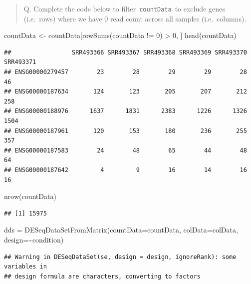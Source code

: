 \documentclass[
]{article}
\newenvironment{Shaded}{\begin{snugshade}}{\end{snugshade}}
\newcommand{\AttributeTok}[1]{\textcolor[rgb]{0.77,0.63,0.00}{#1}}
\newcommand{\DecValTok}[1]{\textcolor[rgb]{0.00,0.00,0.81}{#1}}
\newcommand{\FunctionTok}[1]{\textcolor[rgb]{0.00,0.00,0.00}{#1}}
\newcommand{\NormalTok}[1]{#1}
\newcommand{\OtherTok}[1]{\textcolor[rgb]{0.56,0.35,0.01}{#1}}
\newcommand{\SpecialCharTok}[1]{\textcolor[rgb]{0.00,0.00,0.00}{#1}}
\begin{document}
\begin{quote}
Q. Complete the code below to filter~\texttt{countData}~to exclude genes
(i.e.~rows) where we have 0 read count across all samples
(i.e.~columns).
\end{quote}

\begin{Shaded}
\begin{Highlighting}[]
\NormalTok{countData }\OtherTok{\textless{}{-}}\NormalTok{ countData[}\FunctionTok{rowSums}\NormalTok{(countData }\SpecialCharTok{!=} \DecValTok{0}\NormalTok{) }\SpecialCharTok{\textgreater{}} \DecValTok{0}\NormalTok{, ]}
\FunctionTok{head}\NormalTok{(countData)}
\end{Highlighting}
\end{Shaded}

\begin{verbatim}
##                 SRR493366 SRR493367 SRR493368 SRR493369 SRR493370 SRR493371
## ENSG00000279457        23        28        29        29        28        46
## ENSG00000187634       124       123       205       207       212       258
## ENSG00000188976      1637      1831      2383      1226      1326      1504
## ENSG00000187961       120       153       180       236       255       357
## ENSG00000187583        24        48        65        44        48        64
## ENSG00000187642         4         9        16        14        16        16
\end{verbatim}

\begin{Shaded}
\begin{Highlighting}[]
\FunctionTok{nrow}\NormalTok{(countData)}
\end{Highlighting}
\end{Shaded}

\begin{verbatim}
## [1] 15975
\end{verbatim}

\begin{Shaded}
\begin{Highlighting}[]
\NormalTok{dds }\OtherTok{=} \FunctionTok{DESeqDataSetFromMatrix}\NormalTok{(}\AttributeTok{countData=}\NormalTok{countData,}
                             \AttributeTok{colData=}\NormalTok{colData,}
                             \AttributeTok{design=}\SpecialCharTok{\textasciitilde{}}\NormalTok{condition)}
\end{Highlighting}
\end{Shaded}

\begin{verbatim}
## Warning in DESeqDataSet(se, design = design, ignoreRank): some variables in
## design formula are characters, converting to factors
\end{verbatim}
\end{document}
